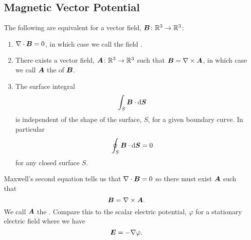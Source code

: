     \subsection{Magnetic Vector Potential}
    \begin{theorem}
        The following are equivalent for a vector field, \(\bm{B}\colon\mathbb{R}^3 \to \mathbb{R}^3\):
        \begin{enumerate}
            \item \(\nabla\cdot\bm{B} = 0\), in which case we call the field .
            \item There exists a vector field, \(\bm{A}\colon\mathbb{R}^3\to\mathbb{R}^3\) such that \(\bm{B} = \nabla\times\bm{A}\), in which case we call \(\bm{A}\) the  of \(\bm{B}\).
            \item The surface integral
            \[\int_S\bm{B}\cdot\dd{\bm{S}}\]
            is independent of the shape of the surface, \(S\), for a given boundary curve.
            In particular
            \[\oint_S\bm{B}\cdot\dd{\bm{S}} = 0\]
            for any closed surface \(S\).
        \end{enumerate}
    \end{theorem}
    Maxwell's second equation tells us that \(\nabla\cdot\bm{B} = 0\) so there must exist \(\bm{A}\) such that
    \[\bm{B} = \nabla\times\bm{A}.\]
    We call \(\bm{A}\) the .
    Compare this to the scalar electric potential, \(\varphi\) for a stationary electric field where we have
    \[\bm{E} = -\nabla\varphi.\]
    
